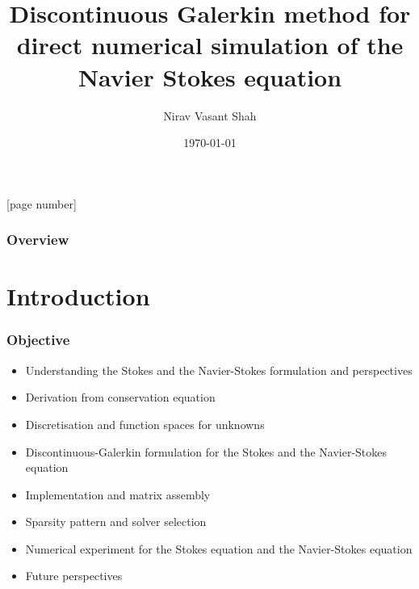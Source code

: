 \documentclass{beamer}
\title[DG for Navier Stokes]{Discontinuous Galerkin method for direct numerical simulation of the Navier Stokes equation} %
\author{Nirav Vasant Shah} %
\institute[Universit\"at Stuttgart] %
{
Universit\"at Stuttgart \\ %
\medskip
\textit{niravshah.svnit@gmail.com} %
}
\date{\today} %
\begin{document}
\begin{frame}
\titlepage %
\end{frame}

\thispagestyle{empty}
[page number]
\begin{frame}
\frametitle{Overview} %
\tableofcontents %
\end{frame}




\section{Introduction} %
\begin{frame}
\frametitle{Objective}
\begin{itemize}

\item Understanding the Stokes and the Navier-Stokes formulation and perspectives
\item Derivation from conservation equation
\item Discretisation and function spaces for unknowns
\item Discontinuous-Galerkin formulation for the Stokes and the Navier-Stokes equation
\item Implementation and matrix assembly
\item Sparsity pattern and solver selection
\item Numerical experiment for the Stokes equation and the Navier-Stokes equation
\item Future perspectives

\end{itemize}
\end{frame}
\end{document}

